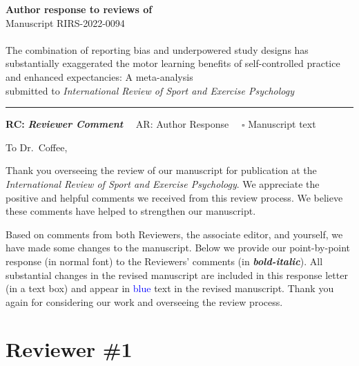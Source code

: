 \documentclass[final]{article}
\begin{document}
{\Large\bf Author response to reviews of}\\[1em]
Manuscript RIRS-2022-0094\\ \\
{\Large The combination of reporting bias and underpowered study designs has substantially exaggerated the motor learning benefits of self-controlled practice and enhanced expectancies: A meta-analysis}\\[1em]

{submitted to \it International Review of Sport and Exercise Psychology }\\
\hrule

\hfill {\bfseries RC:} \textbf{\textit{Reviewer Comment}}\(\quad\) AR: Author Response \(\quad\square\) Manuscript text

\vspace{2em}

To Dr.~Coffee,

Thank you overseeing the review of our manuscript for publication at the \emph{International Review of Sport and Exercise Psychology}. We appreciate the positive and helpful comments we received from this review process. We believe these comments have helped to strengthen our manuscript.

Based on comments from both Reviewers, the associate editor, and yourself, we have made some changes to the manuscript. Below we provide our point-by-point response (in normal font) to the Reviewers' comments (in \textbf{\emph{bold-italic}}). All substantial changes in the revised manuscript are included in this response letter (in a text box) and appear in \textcolor{blue}{blue} text in the revised manuscript. Thank you again for considering our work and overseeing the review process.

\hypertarget{reviewer-1}{%
\section{Reviewer \#1}\label{reviewer-1}}

\end{document}

